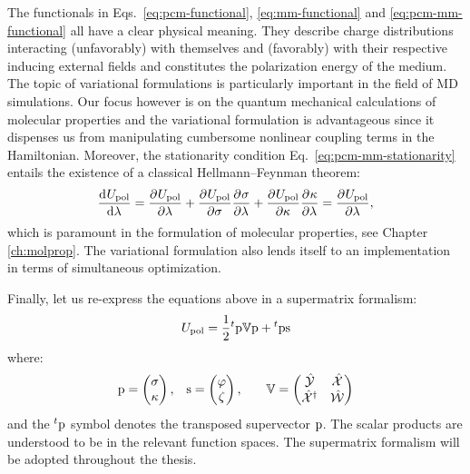 The functionals in Eqs.~\eqref{eq:pcm-functional},
\eqref{eq:mm-functional} and \eqref{eq:pcm-mm-functional} all have a
clear physical meaning.
They describe charge distributions interacting (unfavorably) with
themselves and (favorably) with their respective inducing external
fields and constitutes the polarization energy of the medium.
The topic of variational formulations is particularly important in the
field of \acrshort{MD} simulations.\autocite{Jadhao2012-gf, Jadhao2013-ry, Jadhao2013-hs,
Solis2013-ef}
Our focus however is on the quantum mechanical calculations of molecular
properties and the variational formulation is advantageous since it
dispenses us from manipulating cumbersome nonlinear coupling terms in
the Hamiltonian.
Moreover, the stationarity condition Eq.~\ref{eq:pcm-mm-stationarity}
entails the existence of a classical Hellmann--Feynman theorem:
\begin{equation}\label{eq:classical-HF}
  \frac{\mathop{}\!\mathrm{d}^{}U_\mathrm{pol}}{\mathop{}\!\mathrm{d} \lambda^{}} = \frac{\partial^{}U_\mathrm{pol}} {\partial \lambda^{}}
  + \frac{\partial^{}U_\mathrm{pol}} {\partial \sigma^{}}\frac{\partial^{}\sigma} {\partial \lambda^{}}
  + \frac{\partial^{}U_\mathrm{pol}} {\partial \kappa^{}}\frac{\partial^{}\kappa} {\partial \lambda^{}}
  = \frac{\partial^{}U_\mathrm{pol}} {\partial \lambda^{}},
\end{equation}
which is paramount in the formulation of molecular properties, see
Chapter \ref{ch:molprop}.
The variational formulation also lends itself to an implementation
in terms of simultaneous optimization.\autocite{Lipparini2011-aj}

Finally, let us re-express the equations above in a supermatrix
formalism:
\begin{equation}
  U_\mathrm{pol} =
  \frac{1}{2}{}^t\mathrm{p}\mathbb{V}\mathrm{p} + {}^t\mathrm{p}\mathrm{s}
\end{equation}
where:
\begin{alignat}{3}
  \mathrm{p} =
  \begin{pmatrix}
    \sigma \\
    \kappa
  \end{pmatrix},
  \quad&
  \mathrm{s} =
  \begin{pmatrix}
   \varphi \\
   \zeta
  \end{pmatrix},
  \quad&
  \mathbb{V} =
  \begin{pmatrix}
    \hat{\mathcal{Y}} & \hat{\mathcal{X}} \\
    \hat{\mathcal{X}}^\dagger & \hat{\mathcal{W}}
  \end{pmatrix}
\end{alignat}
and the ${}^t\mathrm{p}$ symbol denotes the transposed supervector $\mathrm{p}$.
The scalar products are understood to be in the relevant function
spaces.
The supermatrix formalism will be adopted throughout the thesis.

